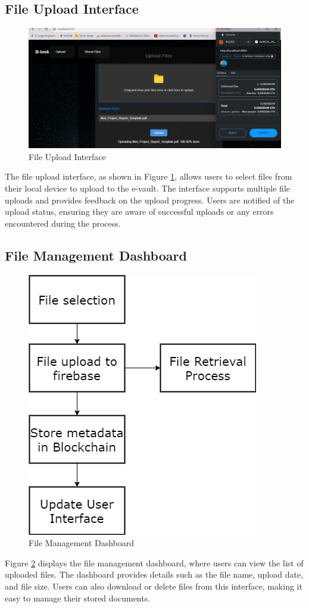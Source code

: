 \documentclass[12pt,a4paper]{report}
\begin{document}
\subsection{File Upload Interface}
\begin{figure}[hbtp]
    \centering
    \includegraphics[scale=0.4]{./pic/fileupload.png}
    \caption{File Upload Interface}
    \label{fig:fileupload}
\end{figure}
The file upload interface, as shown in Figure \ref{fig:fileupload}, allows users to select files from their local device to upload to the e-vault. The interface supports multiple file uploads and provides feedback on the upload progress. Users are notified of the upload status, ensuring they are aware of successful uploads or any errors encountered during the process.

\subsection{File Management Dashboard}
\begin{figure}[hbtp]
    \centering
    \includegraphics[scale=0.4]{./pic/dataflow.png}
    \caption{File Management Dashboard}
    \label{fig:dashboard}
\end{figure}
Figure \ref{fig:dashboard} displays the file management dashboard, where users can view the list of uploaded files. The dashboard provides details such as the file name, upload date, and file size. Users can also download or delete files from this interface, making it easy to manage their stored documents.
\end{document}
